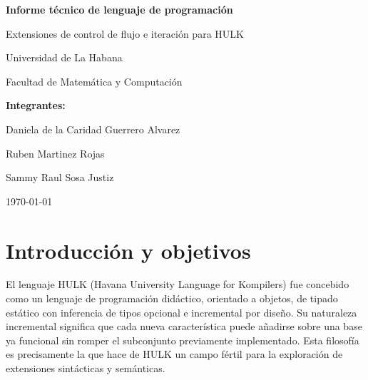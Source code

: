 \documentclass[12pt, a4paper]{article}
\begin{document}
\begin{titlepage}
  \centering
  \vspace*{2cm}
  {\LARGE\bfseries Informe técnico de lenguaje de programación\par}
  \vspace{0.5cm}
  {\large Extensiones de control de flujo e iteración para HULK\par}
  \vspace{2cm}

  {\large Universidad de La Habana\par}
  \vspace{1cm}
  {\normalsize Facultad de Matemática y Computación\par}
  \vspace{0.5cm}
  {\normalsize \textbf{Integrantes:}\par}
  {\normalsize Daniela de la Caridad Guerrero Alvarez\par}
  {\normalsize Ruben Martinez Rojas\par}
  {\normalsize Sammy Raul Sosa Justiz\par}
  \vspace{0.3cm}

  \vfill
  {\large \today\par}
\end{titlepage}

\tableofcontents
\newpage

\section{Introducción y objetivos}

El lenguaje HULK (Havana University Language for Kompilers) fue concebido como un lenguaje de programación didáctico, orientado a objetos, de tipado estático con inferencia de tipos opcional e incremental por diseño. Su naturaleza incremental significa que cada nueva característica puede añadirse sobre una base ya funcional sin romper el subconjunto previamente implementado. Esta filosofía es precisamente la que hace de HULK un campo fértil para la exploración de extensiones sintácticas y semánticas.
\end{document}
